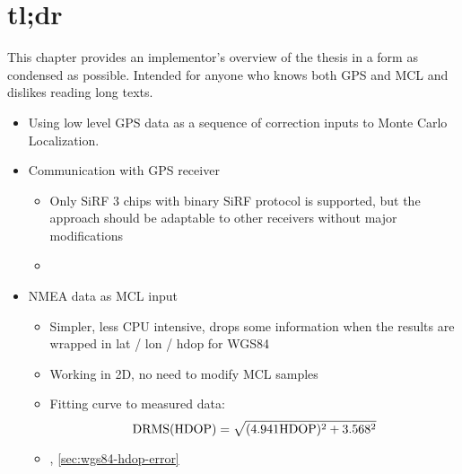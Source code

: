 \chapter{tl;dr}
This chapter provides an implementor's overview of the thesis in a form as
condensed as possible.
Intended for anyone who knows both GPS and MCL and dislikes reading long texts.

\begin{itemize}
\item
Using low level GPS data as a sequence of correction inputs to Monte Carlo Localization.

\item
Communication with GPS receiver
\begin{itemize}
    \item Only SiRF 3 chips with binary SiRF protocol is supported, but the
    approach should be adaptable to other receivers without major modifications
    \item {}
\end{itemize}

\item
NMEA data as MCL input
\begin{itemize}
    \item Simpler, less CPU intensive, drops some information when the results are
    wrapped in lat / lon / hdop for WGS84
    \item Working in 2D, no need to modify MCL samples
    \item
        Fitting curve to measured data:
        \begin{equation*}
            \mathrm{DRMS}(\mathrm{HDOP}) = \sqrt{(\num{4.941}\mathrm{HDOP})^2 + \num{3.568}^2}
        \end{equation*}
    \item {}, \cref{sec:wgs84-hdop-error}
\end{itemize}

\end{itemize}
